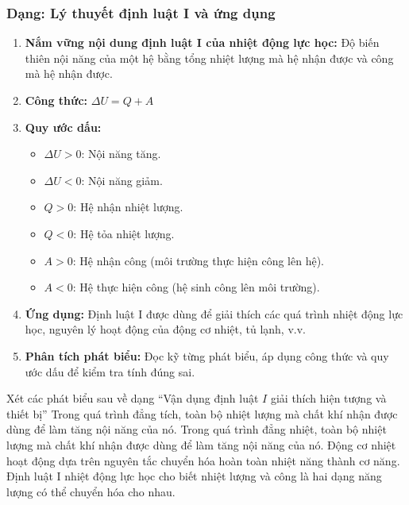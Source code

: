 \subsubsection{Dạng: Lý thuyết định luật I và ứng dụng}
\begin{phuongphap}
\begin{enumerate}
    \item \textbf{Nắm vững nội dung định luật I của nhiệt động lực học:} Độ biến thiên nội năng của một hệ bằng tổng nhiệt lượng mà hệ nhận được và công mà hệ nhận được.
    \item \textbf{Công thức:} $\Delta U = Q + A$
    \item \textbf{Quy ước dấu:}
    \begin{itemize}
        \item $\Delta U > 0$: Nội năng tăng.
        \item $\Delta U < 0$: Nội năng giảm.
        \item $Q > 0$: Hệ nhận nhiệt lượng.
        \item $Q < 0$: Hệ tỏa nhiệt lượng.
        \item $A > 0$: Hệ nhận công (môi trường thực hiện công lên hệ).
        \item $A < 0$: Hệ thực hiện công (hệ sinh công lên môi trường).
    \end{itemize}
    \item \textbf{Ứng dụng:} Định luật I được dùng để giải thích các quá trình nhiệt động lực học, nguyên lý hoạt động của động cơ nhiệt, tủ lạnh, v.v.
    \item \textbf{Phân tích phát biểu:} Đọc kỹ từng phát biểu, áp dụng công thức và quy ước dấu để kiểm tra tính đúng sai.
\end{enumerate}
\end{phuongphap}
\begin{vidumau}
Xét các phát biểu sau về dạng “Vận dụng định luật $I$ giải thích hiện tượng và thiết bị”
\choice
{\True Trong quá trình đẳng tích, toàn bộ nhiệt lượng mà chất khí nhận được dùng để làm tăng nội năng của nó.}
{Trong quá trình đẳng nhiệt, toàn bộ nhiệt lượng mà chất khí nhận được dùng để làm tăng nội năng của nó.}
{Động cơ nhiệt hoạt động dựa trên nguyên tắc chuyển hóa hoàn toàn nhiệt năng thành cơ năng.}
{Định luật I nhiệt động lực học cho biết nhiệt lượng và công là hai dạng năng lượng có thể chuyển hóa cho nhau.}
\end{vidumau}

